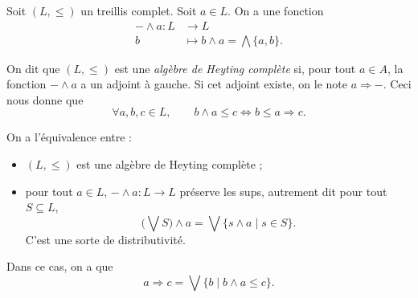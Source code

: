 \documentclass[./main]{subfiles}
\begin{document}
  \begin{exm}
    Soit $(L, \le)$ un treillis complet.
    Soit $a \in L$.
    On a une fonction 
     \begin{align*}
      - \wedge a: L &\longrightarrow L \\
      b &\longmapsto b \wedge a = \bigwedge \{a, b\} 
    .\end{align*}

    On dit que $(L, \le)$ est une \textit{algèbre de Heyting complète} si, pour tout $a \in A$, la fonction $- \wedge a$ a un adjoint à gauche.
    Si cet adjoint existe, on le note $a \Rightarrow -$.
    Ceci nous donne que 
    \[
    \forall a, b, c \in L, \quad\quad b \wedge a \le c \iff b \le a \Rightarrow c
    .\] 

    On a l'équivalence entre :
    \begin{itemize}
      \item $(L, \le)$ est une algèbre de Heyting complète ;
      \item pour tout $a \in L$, $- \wedge a : L \to L$ préserve les sups, autrement dit pour tout $S \subseteq L$, 
        \[
          \big(\bigvee S\big) \wedge a = \bigvee \{s \wedge a  \mid s \in S\} 
        .\] 
        C'est une sorte de distributivité.
    \end{itemize}
    Dans ce cas, on a que 
    \[
    a \Rightarrow c = \bigvee \{b  \mid b \wedge a \le c\}
    .\] 
  \end{exm}
\end{document}
